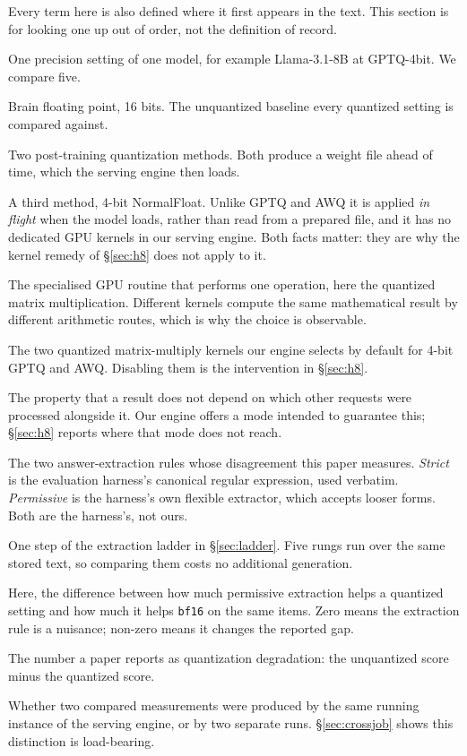 \documentclass[11pt]{article}
\begin{document}
Every term here is also defined where it first appears in the text. This section is for
looking one up out of order, not the definition of record.

\begin{description}\itemsep2pt
  \item[arm] One precision setting of one model, for example Llama-3.1-8B at
    GPTQ-4bit. We compare five.
  \item[\texttt{bf16}] Brain floating point, 16 bits. The unquantized baseline every
    quantized setting is compared against.
  \item[GPTQ, AWQ] Two post-training quantization methods. Both produce a weight file
    ahead of time, which the serving engine then loads.
  \item[bitsandbytes NF4] A third method, 4-bit NormalFloat. Unlike GPTQ and AWQ it is
    applied \emph{in flight} when the model loads, rather than read from a prepared file,
    and it has no dedicated GPU kernels in our serving engine. Both facts matter: they are
    why the kernel remedy of \S\ref{sec:h8} does not apply to it.
  \item[kernel] The specialised GPU routine that performs one operation, here the
    quantized matrix multiplication. Different kernels compute the same mathematical
    result by different arithmetic routes, which is why the choice is observable.
  \item[Marlin, Machete] The two quantized matrix-multiply kernels our engine selects by
    default for 4-bit GPTQ and AWQ. Disabling them is the intervention in \S\ref{sec:h8}.
  \item[batch invariance] The property that a result does not depend on which other
    requests were processed alongside it. Our engine offers a mode intended to guarantee
    this; \S\ref{sec:h8} reports where that mode does not reach.
  \item[strict, permissive] The two answer-extraction rules whose disagreement this paper
    measures. \emph{Strict} is the evaluation harness's canonical regular expression, used
    verbatim. \emph{Permissive} is the harness's own flexible extractor, which accepts
    looser forms. Both are the harness's, not ours.
  \item[rung] One step of the extraction ladder in \S\ref{sec:ladder}. Five rungs run
    over the same stored text, so comparing them costs no additional generation.
  \item[interaction] Here, the difference between how much permissive extraction helps a
    quantized setting and how much it helps \texttt{bf16} on the same items. Zero means
    the extraction rule is a nuisance; non-zero means it changes the reported gap.
  \item[the gap, the reported difference] The number a paper reports as quantization
    degradation: the unquantized score minus the quantized score.
  \item[within a process, across processes] Whether two compared measurements were
    produced by the same running instance of the serving engine, or by two separate runs.
    \S\ref{sec:crossjob} shows this distinction is load-bearing.
\end{description}
\end{document}
